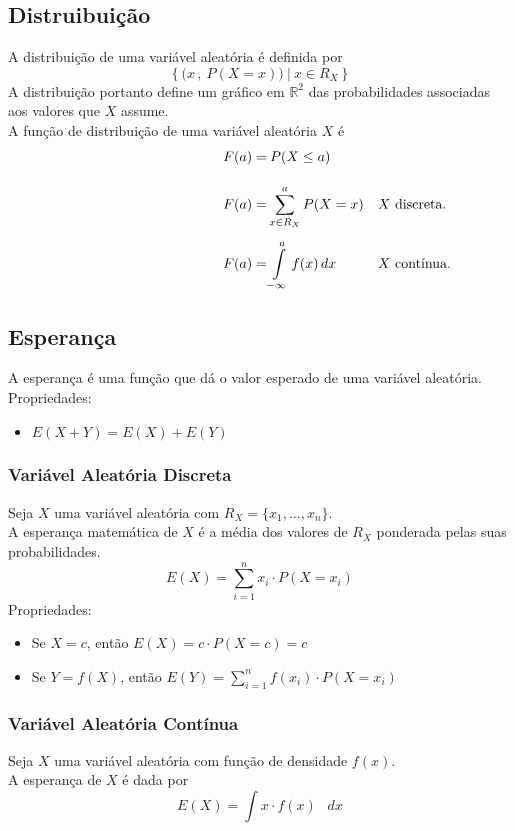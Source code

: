 \documentclass{article}
\newcommand*\diff{\mathop{}\!d}
\begin{document}
\subsection{Distruibuição}
A distribuição de uma variável aleatória é definida por
\[ \left\{ \big( x\,,\: P(X = x) \big) \:\Big|\: x \in R_X \right\} \]
A distribuição portanto define um gráfico em $\mathbb{R}^2$ das probabilidades associadas aos valores que $X$ assume. \\[10pt]
A função de distribuição de uma variável aleatória $X$ é
\begin{align*}
  F(a) =&\> P(X \leq a) \\[10pt]
  \hspace{120px} F(a) =& \sum\limits_{x \in R_X}^{a} P(X = x) && \text{$X$ discreta.} \\[5pt]
  F(a) =& \int\limits_{-\infty}^a f(x) \diff x && \text{$X$ contínua.}
\end{align*}


\subsection{Esperança}
A esperança é uma função que dá o valor esperado de uma variável aleatória. \\[5pt]
Propriedades:
\begin{itemize}
  \item $E(X + Y) = E(X) + E(Y)$
\end{itemize}

\subsubsection{Variável Aleatória Discreta}
Seja $X$ uma variável aleatória com $R_X = \{x_1, \hdots, x_n\}$. \\
A esperança matemática de $X$ é a média dos valores de $R_X$ ponderada pelas suas probabilidades.
\[ E(X) = \sum_{i=1}^{n} x_i \cdot P(X = x_i) \] %
Propriedades:
\begin{itemize}
  \item Se $X = c$, então $E(X) = c \cdot P(X = c) = c$
  \item Se $Y = f(X)$, então $E(Y) = \sum\limits_{i = 1}^{n} f(x_i) \cdot P(X = x_i)$
\end{itemize}

\subsubsection{Variável Aleatória Contínua}
Seja $X$ uma variável aleatória com função de densidade $f(x)$. \\
A esperança de $X$ é dada por
\[ E(X) = \int x \cdot f(x) \> \diff x \]
\end{document}
